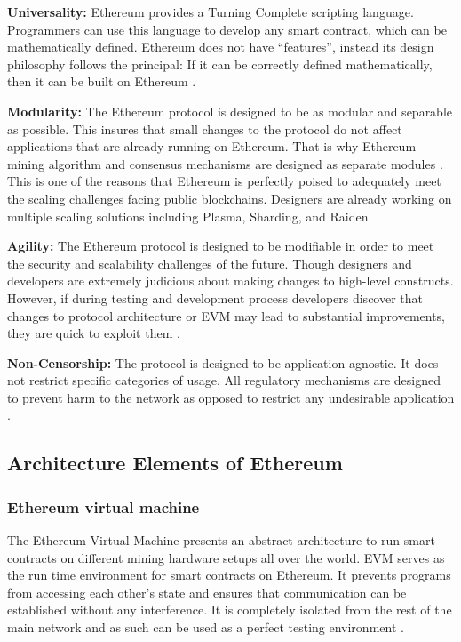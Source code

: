 \textbf{Universality:} Ethereum provides a Turning Complete scripting language.  Programmers can use this language to develop any smart contract, which can be mathematically defined.  Ethereum does not have “features”, instead its design philosophy follows the principal: If it can be correctly defined mathematically, then it can be built on Ethereum \cite{eth:001}. 

\textbf{Modularity:} The Ethereum protocol is designed to be as modular and separable as possible. This insures that small changes to the protocol do not affect applications that are already running on Ethereum. That is why Ethereum mining algorithm and consensus mechanisms are designed as separate modules \cite{eth:001}. This is one of the reasons that Ethereum is perfectly poised to adequately meet the scaling challenges facing public blockchains. Designers are already working on multiple scaling solutions including Plasma, Sharding, and Raiden.

\textbf{Agility:} The Ethereum protocol is designed to be modifiable in order to meet the security and scalability challenges of the future. Though designers and developers are extremely judicious about making changes to high-level constructs. However, if during testing and development process developers discover that changes to protocol architecture or EVM may lead to substantial improvements, they are quick to exploit them \cite{eth:001}. 

\textbf{Non-Censorship:} The protocol is designed to be application agnostic. It does not restrict specific categories of usage. All regulatory mechanisms are designed to prevent harm to the network as opposed to restrict any undesirable application \cite{eth:001}.
\vspace{0.5cm}  
\subsection*{Architecture Elements of Ethereum}
\subsubsection{Ethereum virtual machine}
The Ethereum Virtual Machine presents an abstract architecture to run smart contracts on different mining hardware setups all over the world. EVM serves as the run time environment for smart contracts on Ethereum. It prevents programs from accessing each other’s state and ensures that communication can be established without any interference. It is completely isolated from the rest of the main network and as such can be used as a perfect testing environment \cite{misc:023}.
\vspace{0.5cm}  
